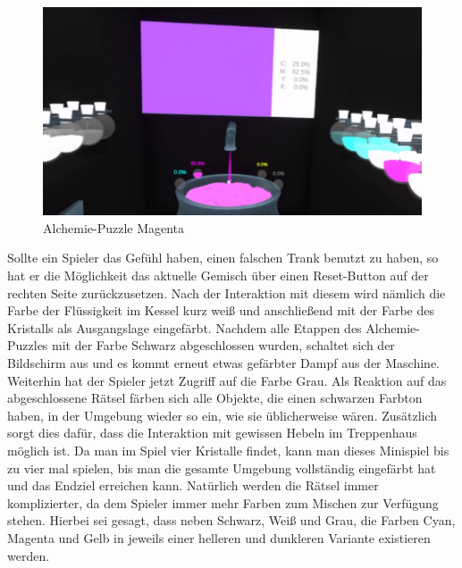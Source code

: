 \begin{figure}[h]
	\centering
	\includegraphics[width=\textwidth/2]{Pictures/Alchemie_Magenta}
	\caption{Alchemie-Puzzle Magenta}
	\label{fig:alchemie_magenta}
\end{figure}\newpage \noindent
Sollte ein Spieler das Gefühl haben, einen falschen Trank benutzt zu haben, so hat er die Möglichkeit das aktuelle Gemisch über einen Reset-Button auf der rechten Seite zurückzusetzen. Nach der Interaktion mit diesem wird nämlich die Farbe der Flüssigkeit im Kessel kurz weiß und anschließend mit der Farbe des Kristalls als Ausgangslage eingefärbt. Nachdem alle Etappen des Alchemie-Puzzles mit der Farbe Schwarz abgeschlossen wurden, schaltet sich der Bildschirm aus und es kommt erneut etwas gefärbter Dampf aus der Maschine. Weiterhin hat der Spieler jetzt Zugriff auf die Farbe Grau. Als Reaktion auf das abgeschlossene Rätsel färben sich alle Objekte, die einen schwarzen Farbton haben, in der Umgebung wieder so ein, wie sie üblicherweise wären. Zusätzlich sorgt dies dafür, dass die Interaktion mit gewissen Hebeln im Treppenhaus möglich ist. Da man im Spiel vier Kristalle findet, kann man dieses Minispiel bis zu vier mal spielen, bis man die gesamte Umgebung vollständig eingefärbt hat und das Endziel erreichen kann. Natürlich werden die Rätsel immer komplizierter, da dem Spieler immer mehr Farben zum Mischen zur Verfügung stehen. Hierbei sei gesagt, dass neben Schwarz, Weiß und Grau, die Farben Cyan, Magenta und Gelb in jeweils einer helleren und dunkleren Variante existieren werden. 
